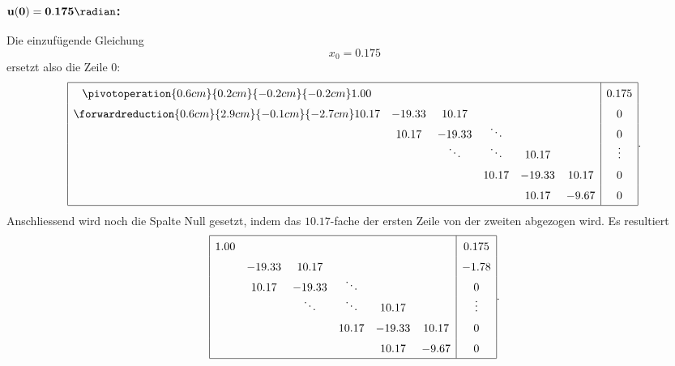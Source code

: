 \subsubsection{$\mathbf{u(0) = 0.175 \radian}$:}
Die einzufügende Gleichung
\begin{equation*}
    x_0 = 0.175
\end{equation*}
ersetzt also die Zeile $0$:
\begin{equation*}
    \def\arraystretch{1.5}
    \begin{array}{|cccccc|c|}
        \hline
        \pivotoperation{0.6cm}{0.2cm}{-0.2cm}{-0.2cm}
         1.00  &        &                &                &        &        & 0.175          \\
        \forwardreduction{0.6cm}{2.9cm}{-0.1cm}{-2.7cm}
        10.17  &-19.33  & 10.17          &                &        &        & 0              \\
               & 10.17  &-19.33          & \smash{\ddots} &        &        & 0              \\
               &        & \smash{\ddots} & \smash{\ddots} & 10.17  &        & \smash{\vdots} \\
               &        &                & 10.17          &-19.33  & 10.17  & 0              \\
               &        &                &                & 10.17  & -9.67  & 0              \\
        \hline
    \end{array}.
\end{equation*}
Anschliessend wird noch die Spalte Null gesetzt, indem das $ 10.17 $-fache der ersten Zeile von der zweiten abgezogen wird.
Es resultiert
\begin{equation*}
    \def\arraystretch{1.5}
    \begin{array}{|cccccc|c|}
        \hline
         1.00  &        &                &                &        &        & 0.175          \\ 
               &-19.33  & 10.17          &                &        &        & -1.78          \\
               & 10.17  &-19.33          & \smash{\ddots} &        &        & 0              \\
               &        & \smash{\ddots} & \smash{\ddots} & 10.17  &        & \smash{\vdots} \\
               &        &                & 10.17          &-19.33  & 10.17  & 0              \\
               &        &                &                & 10.17  & -9.67  & 0              \\
        \hline
    \end{array}.
\end{equation*}

